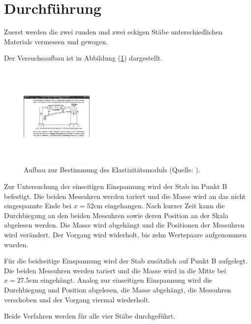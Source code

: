 
\section{Durchführung}
Zuerst werden die zwei runden und zwei eckigen Stäbe unterschiedlichen Materials vermessen und gewogen.

\noindent
Der Versuchsaufbau ist in Abbildung (\ref{fig:aufbau}) dargestellt.

\begin{figure}
    \centering
       \includegraphics[height=5cm]{aufbau.pdf}
       \caption{Aufbau zur Bestimmung des Elastizitätsmoduls (Quelle: \cite{V103}).}
       \label{fig:aufbau}
\end{figure}

\noindent
Zur Untersuchung der einseitigen Einspannung wird der Stab im Punkt B befestigt.
Die beiden Messuhren werden tariert und die Masse wird an das nicht eingespannte Ende bei $x=52 \si{\centi\meter}$ eingehangen.
Nach kurzer Zeit kann die Durchbiegung an den beiden Messuhren sowie deren Position an der Skala abgelesen werden.
Die Masse wird abgehängt und die Positionen der Messuhren wird verändert.
Der Vorgang wird widerholt, bis zehn Wertepaare aufgenommen wurden.

\noindent
Für die beidseitige Einspannung wird der Stab zusätzlich auf Punkt B aufgelegt.
Die beiden Messuhren werden tariert und die Masse wird in die Mitte bei $x=27.5 \si{\centi\meter}$ eingehängt.
Analog zur einseitigen Einspannung wird die Durchbiegung und Position abgelesen, die Masse abgehängt, die Messuhren verschoben und der Vorgang viermal wiederholt.

\noindent
Beide Verfahren werden für alle vier Stäbe durchgeführt.

